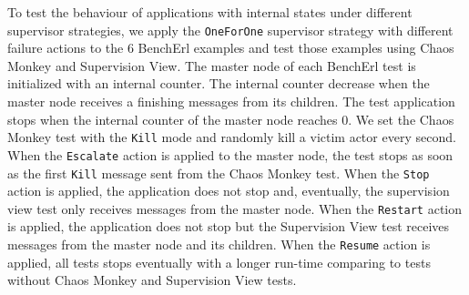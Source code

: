 To test the behaviour of applications with internal states under 
different supervisor strategies, we apply the {\tt OneForOne} supervisor 
strategy with different failure actions to the 6 BenchErl examples and test 
those examples using Chaos Monkey and Supervision View.  The master node of 
each BenchErl test is initialized with an internal counter.  The internal 
counter decrease when the master node receives a finishing messages from its 
children.  The test application stops when the internal counter of the master 
node reaches 0.  We set the Chaos Monkey test with the {\tt Kill} mode and 
randomly kill a victim actor every second.  When the {\tt Escalate} action is 
applied to the master node, the test stops as soon as the first {\tt Kill} 
message sent from the Chaos Monkey test.  When the {\tt Stop} action is applied, 
the application does not stop and, eventually, the supervision view test only 
receives messages from the master node.  When the {\tt Restart} action is 
applied, the application does not stop but the Supervision View test receives 
messages from the master node and its children.  When the {\tt Resume} action is 
applied, all tests stops eventually with a longer run-time comparing to tests 
without Chaos Monkey and Supervision View tests.

